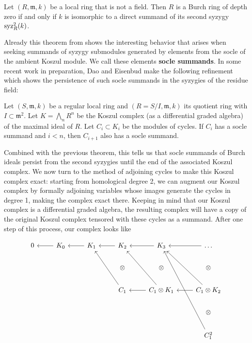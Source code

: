 \documentclass[twoside,12pt, leqno]{amsart}
\begin{document}
\begin{theorem}
	Let $(R, \mathfrak{m}, k)$ be a local ring that is not a field. Then $R$ is a Burch ring of depth zero if and only if $k$ is isomorphic to a direct summand of its second syzygy $\operatorname{syz}_R^2 (k)$.
\end{theorem}

Already this theorem from \cite{DKT20} shows the interesting behavior that arises when seeking summands of syzygy submodules generated by elements from the socle of the ambient Koszul module. We call these elements \textbf{socle summands}. In some recent work in preparation, Dao and Eisenbud make the following refinement which shows the persistence of such socle summands in the syzygies of the residue field:

\begin{theorem}
	Let $(S, \mathfrak{m}, k)$ be a regular local ring and $(R = S / I, \mathfrak{m}, k)$ its quotient ring with $I \subset \mathfrak{m}^2$. Let $K = \bigwedge_n R^n$ be the Koszul complex (as a differential graded algebra) of the maximal ideal of $R$. Let $C_i \subset K_i$ be the modules of cycles. If $C_i$ has a socle summand and $i < n$, then $C_{i+1}$ also has a socle summand.
\end{theorem}

Combined with the previous theorem, this tells us that socle summands of Burch ideals persist from the second syzygies until the end of the associated Koszul complex. We now turn to the method of adjoining cycles to make this Koszul complex exact: starting from homological degree 2, we can augment our Koszul complex by formally adjoining variables whose images generate the cycles in degree 1, making the complex exact there. Keeping in mind that our Koszul complex is a differential graded algebra, the resulting complex will have a copy of the original Koszul complex tensored with these cycles as a summand. After one step of this process, our complex looks like

\[\begin{tikzcd}
	0 & {K_0} & {K_1} & {K_2} & {K_3} & \ldots \\
	&&& \otimes & \otimes & \otimes \\
	&&& {C_1} & {C_1 \otimes K_1} & {C_1 \otimes K_2} \\
	&&&&& \otimes \\
	&&&&& {C_1^2}
	\arrow[from=1-2, to=1-1]
	\arrow[from=1-3, to=1-2]
	\arrow[from=1-4, to=1-3]
	\arrow[from=1-5, to=1-4]
	\arrow[from=3-4, to=1-3]
	\arrow[from=3-5, to=3-4]
	\arrow[from=1-6, to=1-5]
	\arrow[from=3-6, to=3-5]
	\arrow[from=3-6, to=1-5]
	\arrow[from=3-5, to=1-4]
	\arrow[from=5-6, to=1-5]
\end{tikzcd}\]
\end{document}
